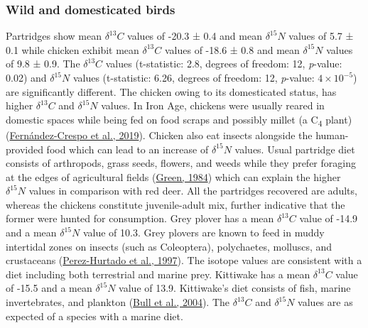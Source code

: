\documentclass[3p]{elsarticle} %
\begin{document}
\hypertarget{wild-and-domesticated-birds}{%
\subsubsection{Wild and domesticated birds}\label{wild-and-domesticated-birds}}

Partridges show mean \(\delta ^{13}C\) values of -20.3 ± 0.4\text{\textperthousand} and mean \(\delta ^{15}N\) values of 5.7 ± 0.1\text{\textperthousand} while chicken exhibit mean \(\delta ^{13}C\) values of -18.6 ± 0.8\text{\textperthousand} and mean \(\delta ^{15}N\) values of 9.8 ± 0.9\text{\textperthousand}. The \(\delta ^{13}C\) values (t-statistic: 2.8, degrees of freedom: 12, \emph{p}-value: 0.02) and \(\delta ^{15}N\) values (t-statistic: 6.26, degrees of freedom: 12, \emph{p}-value: \ensuremath{4\times 10^{-5}}) are significantly different. The chicken owing to its domesticated status, has higher \(\delta ^{13}C\) and \(\delta ^{15}N\) values. In Iron Age, chickens were usually reared in domestic spaces while being fed on food scraps and possibly millet (a C\textsubscript{4} plant) (\protect\hyperlink{ref-fernandez-crespo_etal19}{Fernández-Crespo et al., 2019}). Chicken also eat insects alongside the human-provided food which can lead to an increase of \(\delta ^{15}N\) values. Usual partridge diet consists of arthropods, grass seeds, flowers, and weeds while they prefer foraging at the edges of agricultural fields (\protect\hyperlink{ref-green84}{Green, 1984}) which can explain the higher \(\delta ^{15}N\) values in comparison with red deer. All the partridges recovered are adults, whereas the chickens constitute juvenile-adult mix, further indicative that the former were hunted for consumption. Grey plover has a mean \(\delta ^{13}C\) value of -14.9\text{\textperthousand} and a mean \(\delta ^{15}N\) value of 10.3\text{\textperthousand}. Grey plovers are known to feed in muddy intertidal zones on insects (such as Coleoptera), polychaetes, molluscs, and crustaceans (\protect\hyperlink{ref-perez-hurtado_etal97}{Perez-Hurtado et al., 1997}). The isotope values are consistent with a diet including both terrestrial and marine prey. Kittiwake has a mean \(\delta ^{13}C\) value of -15.5\text{\textperthousand} and a mean \(\delta ^{15}N\) value of 13.9\text{\textperthousand}. Kittiwake's diet consists of fish, marine invertebrates, and plankton (\protect\hyperlink{ref-bull_etal04}{Bull et al., 2004}). The \(\delta ^{13}C\) and \(\delta ^{15}N\) values are as expected of a species with a marine diet.
\end{document}
